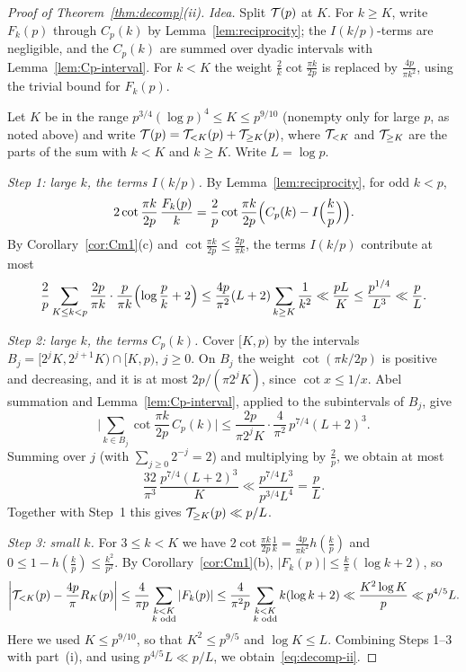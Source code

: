 \begin{proof}[Proof of Theorem~\textup{\ref{thm:decomp}(ii)}]
\emph{Idea.} Split $\mathcal{T}(p)$ at $K$. For $k\ge K$, write $F_k(p)$ through $C_p(k)$ by Lemma~\ref{lem:reciprocity}; the $I(k/p)$-terms are negligible, and the $C_p(k)$ are summed over dyadic intervals with Lemma~\ref{lem:Cp-interval}. For $k<K$ the weight $\frac2k\cot\frac{\pi k}{2p}$ is replaced by $\frac{4p}{\pi k^2}$, using the trivial bound for $F_k(p)$.

Let $K$ be in the range $p^{3/4}(\log p)^4\le K\le p^{9/10}$ (nonempty only for large $p$, as noted above) and write $\mathcal{T}(p)=\mathcal{T}_{<K}(p)+\mathcal{T}_{\ge K}(p)$, where $\mathcal{T}_{<K}$ and $\mathcal{T}_{\ge K}$ are the parts of the sum with $k<K$ and $k\ge K$. Write $L=\log p$.

\emph{Step 1: large $k$, the terms $I(k/p)$.} By Lemma~\ref{lem:reciprocity}, for odd $k<p$,
\[
2\cot\frac{\pi k}{2p}\,\frac{F_k(p)}{k}=\frac2p\cot\frac{\pi k}{2p}\Bigl(C_p(k)-I\Bigl(\frac kp\Bigr)\Bigr).
\]
By Corollary~\ref{cor:Cm1}(c) and $\cot\frac{\pi k}{2p}\le\frac{2p}{\pi k}$, the terms $I(k/p)$ contribute at most
\[
\frac2p\sum_{K\le k<p}\frac{2p}{\pi k}\cdot\frac{p}{\pi k}\Bigl(\log\frac pk+2\Bigr)\le\frac{4p}{\pi^2}(L+2)
\sum_{k\ge K}\frac1{k^2}\ll\frac{pL}{K}\le\frac{p^{1/4}}{L^3}\ll\frac p{L}.
\]

\emph{Step 2: large $k$, the terms $C_p(k)$.} Cover $[K,p)$ by the intervals $B_j=[2^jK,2^{j+1}K)\cap[K,p)$, $j\ge0$. On $B_j$ the weight $\cot(\pi k/2p)$ is positive and decreasing, and it is at most $2p/(\pi2^jK)$, since $\cot x\le1/x$. Abel summation and Lemma~\ref{lem:Cp-interval}, applied to the subintervals of $B_j$, give
\[
\Big|\sum_{k\in B_j}\cot\frac{\pi k}{2p}\,C_p(k)\Big|\le\frac{2p}{\pi2^jK}\cdot\frac4{\pi^2}\,p^{7/4}(L+2)^3.
\]
Summing over $j$ (with $\sum_{j\ge0}2^{-j}=2$) and multiplying by $\frac2p$, we obtain at most
\[
\frac{32}{\pi^3}\,\frac{p^{7/4}(L+2)^3}{K}\ll\frac{p^{7/4}L^3}{p^{3/4}L^4}=\frac pL.
\]
Together with Step~1 this gives $\mathcal{T}_{\ge K}(p)\ll p/L$.

\emph{Step 3: small $k$.} For $3\le k<K$ we have $2\cot\frac{\pi k}{2p}\frac1k=\frac{4p}{\pi k^2}h(\frac kp)$ and $0\le1-h(\frac kp)\le\frac{k^2}{p^2}$. By Corollary~\ref{cor:Cm1}(b), $|F_k(p)|\le\frac k\pi(\log k+2)$, so
\[
\bigg|\mathcal{T}_{<K}(p)-\frac{4p}{\pi}R_K(p)\bigg|\le\frac4{\pi p}\sum_{\substack{k<K\\ k\text{ odd}}}|F_k(p)|
\le\frac4{\pi^2p}\sum_{\substack{k<K\\ k\text{ odd}}}k(\log k+2)\ll\frac{K^2\log K}{p}\ll p^{4/5}L.
\]
Here we used $K\le p^{9/10}$, so that $K^2\le p^{9/5}$ and $\log K\le L$. Combining Steps 1--3 with part~(i), and using $p^{4/5}L\ll p/L$, we obtain~\eqref{eq:decomp-ii}.


\end{proof}
